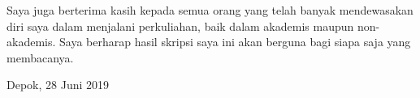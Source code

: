 Saya juga berterima kasih kepada semua orang yang telah banyak mendewasakan diri saya dalam menjalani perkuliahan, baik
dalam akademis maupun non-akademis. Saya berharap hasil skripsi saya ini akan berguna bagi siapa saja yang membacanya.

\vspace*{0.1cm}
\begin{flushright}
Depok, 28 Juni 2019\\[0.1cm]
\vspace*{1cm}
\penulis

\end{flushright}